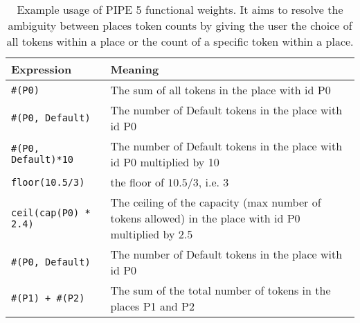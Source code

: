 
\begin{table}[tb]
\begin{center}
  \begin{tabular}{| l | p{10cm} |}
    \hline
    Expression & Meaning \\ 
    \hline
    \texttt{\#(P0)} & The sum of all tokens in the place with id P0 \\
    
    \hline
    \texttt{\#(P0, Default)} & The number of Default tokens in the place with id P0 \\
    
    \hline
    \texttt{\#(P0, Default)*10} & The number of Default tokens in the place with id P0 multiplied by 10\\
    
    \hline
    \texttt{floor(10.5/3)} & the floor of $10.5/3$, i.e. $3$\\
    
    \hline
    \texttt{ceil(cap(P0) * 2.4)} & The ceiling of the capacity (max number of tokens allowed) in the place with id P0 multiplied by 2.5 \\

    \hline
    \texttt{\#(P0, Default)} & The number of Default tokens in the place with id P0 \\

    \hline
    \texttt{\#(P1) + \#(P2)} & The sum of the total number of tokens in the places P1 and P2 \\
    \hline

  \end{tabular}
\caption{Example usage of PIPE 5 functional weights. It aims to resolve the ambiguity between places token counts by giving the user the choice of all tokens within a place or the count of a specific token within a place.}
\label{tbl:functional_weights}
\end{center}
\end{table}

